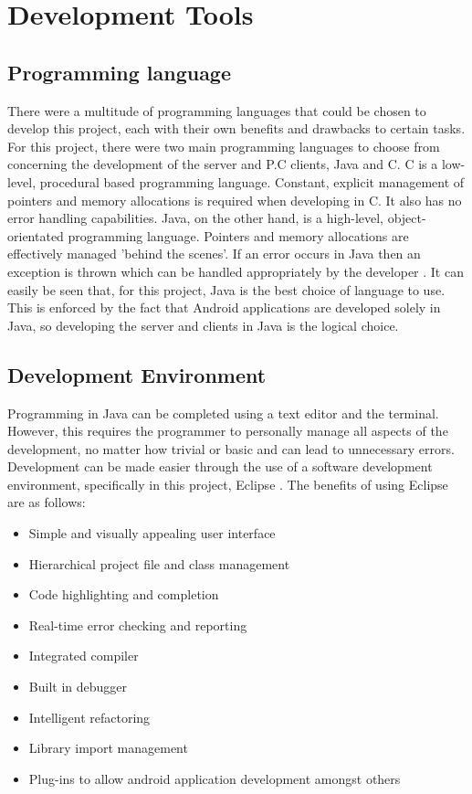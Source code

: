 \documentclass[a4paper,10pt]{report}
\begin{document}
\section{Development Tools}

\subsection{Programming language}

There were a multitude of programming languages that could be chosen to develop this project, each with their own benefits and drawbacks to certain tasks. For this project, there were two main programming languages to choose from concerning the development of the server and P.C clients, Java and C. C is a low-level, procedural based programming language. Constant, explicit management of pointers and memory allocations is required when developing in C. It also has no error handling capabilities. Java, on the other hand, is a high-level, object-orientated programming language. Pointers and memory allocations are effectively managed 'behind the scenes'. If an error occurs in Java then an exception is thrown which can be handled appropriately by the developer \cite{candjava}. It can easily be seen that, for this project, Java is the best choice of language to use. This is enforced by the fact that Android applications are developed solely in Java, so developing the server and clients in Java is the logical choice. 

\subsection{Development Environment}

Programming in Java can be completed using a text editor and the terminal. However, this requires the programmer to personally manage all aspects of the development, no matter how trivial or basic and can lead to unnecessary errors. Development can be made easier through the use of a software development environment, specifically in this project, Eclipse \cite{eclipse}. The benefits of using Eclipse are as follows:

\begin{itemize}
 \item Simple and visually appealing user interface
 \item Hierarchical project file and class management
 \item Code highlighting and completion
 \item Real-time error checking and reporting
 \item Integrated compiler
 \item Built in debugger
 \item Intelligent refactoring
 \item Library import management
 \item Plug-ins to allow android application development amongst others 
\end{itemize}
\end{document}
